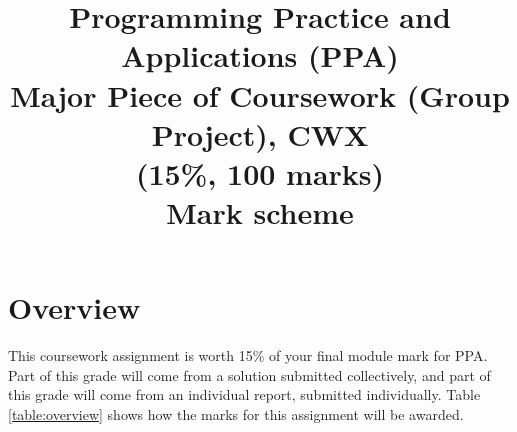 \documentclass[11pt]{article}
\title{Programming Practice and Applications (PPA) \\ Major Piece of Coursework (Group Project), CWX \\ (15\%, 100 marks) \\ \textbf{Mark scheme} }
\date{}                                           %
\begin{document}
\maketitle

\section{Overview}

This coursework assignment is worth 15\% of your final module mark for PPA. Part of this grade will come from a solution submitted collectively, and part of this grade will come from an individual report, submitted individually. Table \ref{table:overview} shows how the marks for this assignment will be awarded.
\end{document}
